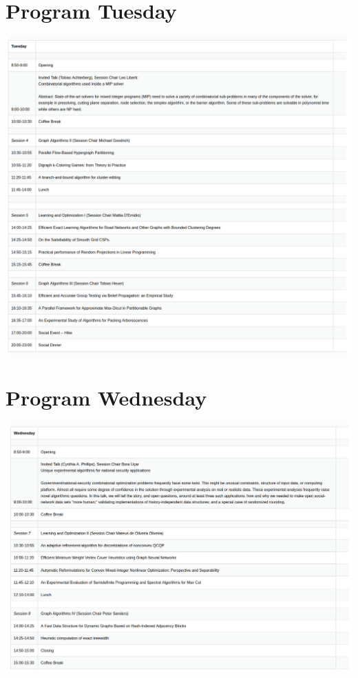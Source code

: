 \documentclass{article}
\begin{document}
\section{Program Tuesday}
\begin{center}
        \includegraphics[width=\textwidth]{programTuesday.png}
\end{center}
\vfill
\pagebreak
\section{Program Wednesday}
\begin{center}
        \includegraphics[width=\textwidth]{programWednesday.png}
\end{center}
\end{document}

